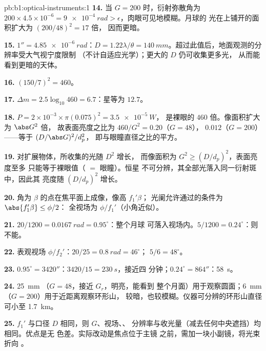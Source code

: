 \begin{solution}{pb:b1:optical-instruments:1}
\textbf{14.} 当 $G = 200$ 时，衍射弥散角为 $200 \times 4.5
\times10^{-6} = \qty{9e-4}{rad} > \epsilon$，肉眼可见地模糊。月球的
光在上铺开的面积扩大为 $(200/48)^2 = 17$ 倍，
因而更暗。

\textbf{15.} $1'' = \qty{4.85e-6}{rad}$：$D = 1.22\lambda/\theta =
\qty{140}{mm}$。超过此值后，地面观测的分辨率受大气视宁度限制
（不计自适应光学）；更大的 $D$ 仍可收集更多光，
从而能看到更暗的天体。

\textbf{16.} $(150/7)^2 = 460$。

\textbf{17.} $\Delta m = 2.5\log_{10}460 = 6.7$：星等为 $12.7$。

\textbf{18.} $P = 2\times10^{-3} \times \pi(0.075)^2 = \qty{3.5e-5}{W}$，
是裸眼的 $460$ 倍。像面积扩大为 $\abs G^2$ 倍，
故表面亮度之比为 $460/G^2 = 0.20$（$G = 48$），
$0.012$（$G = 200$）——等于 $(D/\abs G)^2/d_p^2$，
即与眼瞳直径之比的平方。

\textbf{19.} 对扩展物体，所收集的光随 $D^2$ 增长，
而像面积为 $G^2 \geq (D/d_p)^2$，表面亮度至多
只能等于裸眼值（ $=$ 眼瞳）。恒星
不可分辨，其全部光落入同一衍射斑中，因此其
亮度随 $(D/d_p)^2$ 增长。

\textbf{20.} 角为 $\beta$ 的点在焦平面上成像，像高 $f_1'\beta$；
光阑允许通过的条件为 $\abs{f_1'\beta} \leq \phi/2$：
全视场为 $\phi/f_1'$（小角近似）。

\textbf{21.} $20/1200 = \qty{0.0167}{rad} = 0.95^\circ$：整个月球
可落入视场内。$5/1200 = 0.24^\circ$：则不能。

\textbf{22.} 表观视场 $\phi/f_2'$：$20/25 = \qty{0.8}{rad} = 46^\circ$；
$5/6 = 48^\circ$。

\textbf{23.} $0.95^\circ = 3420''$：$3420/15 = \qty{230}{s}$，接近四
分钟；$0.24^\circ = 864''$：\qty{58}{s}。

\textbf{24.} \qty{25}{mm} （$G = 48$，接近 $G_r$，明亮，能看到
整个月面）用于观察圆面；\qty{6}{mm} （$G = 200$）用于近距离观察环形山，
较暗，也较模糊。仪器可分辨的环形山直径可小至
\qty{1.7}{km}。

\textbf{25.}  $f_1'$ 与口径 $D$ 相同，则 $G$、视场、、
分辨率与收光量（减去任何中央遮挡）均相同。优点是无
色差。实际改动是焦点位于主镜
之前，需加一块小副镜，将光束折向
。
\end{solution}
